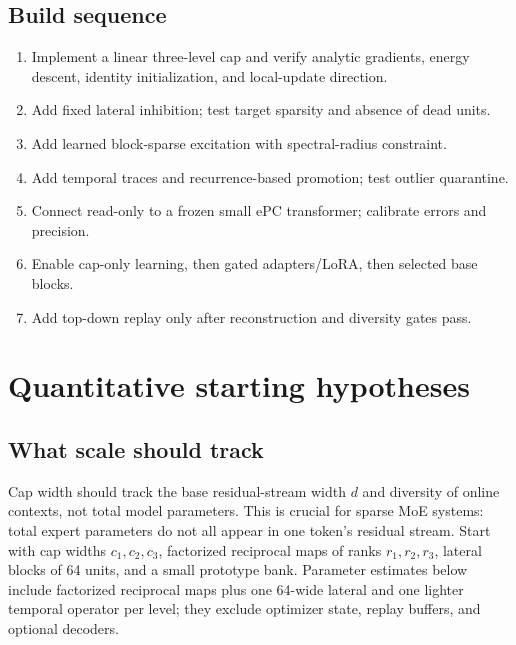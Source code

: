 \documentclass[10pt]{article}
\begin{document}
\subsection{Build sequence}
\begin{enumerate}
  \item Implement a linear three-level cap and verify analytic gradients, energy descent,
  identity initialization, and local-update direction.
  \item Add fixed lateral inhibition; test target sparsity and absence of dead units.
  \item Add learned block-sparse excitation with spectral-radius constraint.
  \item Add temporal traces and recurrence-based promotion; test outlier quarantine.
  \item Connect read-only to a frozen small ePC transformer; calibrate errors and precision.
  \item Enable cap-only learning, then gated adapters/LoRA, then selected base blocks.
  \item Add top-down replay only after reconstruction and diversity gates pass.
\end{enumerate}

\section{Quantitative starting hypotheses}
\subsection{What scale should track}
Cap width should track the base residual-stream width $d$ and diversity of online contexts,
not total model parameters.  This is crucial for sparse MoE systems: total expert parameters
do not all appear in one token's residual stream.  Start with cap widths
$c_1,c_2,c_3$, factorized reciprocal maps of ranks $r_1,r_2,r_3$, lateral blocks of 64 units,
and a small prototype bank.  Parameter estimates below include factorized reciprocal maps
plus one 64-wide lateral and one lighter temporal operator per level; they exclude optimizer
state, replay buffers, and optional decoders.
\end{document}
